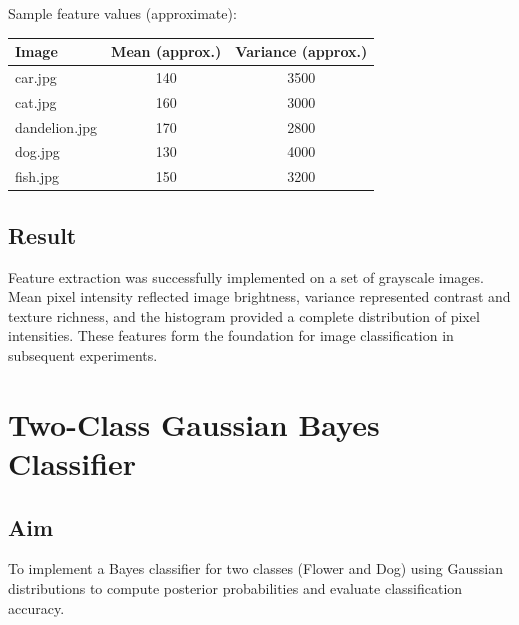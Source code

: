 \documentclass[12pt,a4paper]{article}
\begin{document}
\noindent Sample feature values (approximate):
\begin{center}
\begin{tabular}{lcc}
\toprule
\textbf{Image} & \textbf{Mean (approx.)} & \textbf{Variance (approx.)} \\
\midrule
car.jpg       & 140 & 3500 \\
cat.jpg       & 160 & 3000 \\
dandelion.jpg & 170 & 2800 \\
dog.jpg       & 130 & 4000 \\
fish.jpg      & 150 & 3200 \\
\bottomrule
\end{tabular}
\end{center}

\subsection*{Result}
Feature extraction was successfully implemented on a set of grayscale images. Mean pixel intensity
reflected image brightness, variance represented contrast and texture richness, and the histogram
provided a complete distribution of pixel intensities. These features form the foundation for image
classification in subsequent experiments.

\newpage

\section{Two-Class Gaussian Bayes Classifier}

\subsection*{Aim}
To implement a Bayes classifier for two classes (Flower and Dog) using Gaussian distributions
to compute posterior probabilities and evaluate classification accuracy.
\end{document}
